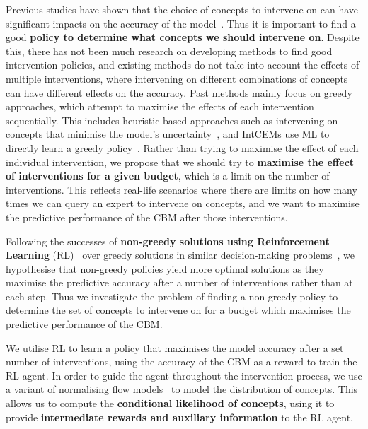 Previous studies have shown that the choice of concepts to 
intervene on can have significant impacts on the accuracy of the model~\cite{coop, cbm, ectp}.
Thus it is important to find a good \textbf{policy to determine what concepts we should intervene on}.
Despite this, there has not been much research on developing
methods to find good intervention policies, and 
existing methods do not
take into account the effects of multiple
interventions, where intervening on different combinations
of concepts can have different effects on the accuracy.
Past methods mainly focus on greedy approaches, which
attempt to maximise the effects of each intervention
sequentially.
This includes heuristic-based approaches such as intervening on concepts that minimise the
model's uncertainty~\cite{ coop, ectp}, and IntCEMs use ML to directly learn a greedy policy~\cite{intcem}.
Rather than trying to maximise the effect of each individual 
intervention, we propose that we should 
try to \textbf{maximise the effect of interventions for a given 
budget}, 
which is a limit on the number of interventions.
This
reflects real-life scenarios where
there are limits on how many times we 
can query an expert to intervene on concepts, and 
we want to maximise the predictive 
performance of the CBM after those interventions.


Following the successes of \textbf{non-greedy solutions 
using 
Reinforcement Learning} (RL)~\cite{rl} over
greedy solutions in similar 
decision-making problems~\cite{gsmrl, non-greedy-2, non-greedy-1},
we hypothesise that non-greedy policies
yield more optimal solutions as they maximise 
the predictive accuracy after a number of interventions rather than at each step.
Thus we investigate the problem of
finding a non-greedy policy to determine
the set of concepts to intervene on for a budget which
maximises the predictive performance of the CBM.

We utilise RL
to learn a policy that maximises
the model accuracy after a set number of interventions,
using the accuracy of the CBM as a reward to train the RL agent.
In order
to guide the agent throughout the intervention process,
we use a variant of normalising flow models~\cite{normalizing-flows} to model the distribution of concepts. 
This allows us to compute the \textbf{conditional likelihood of concepts}, using it to provide \textbf{intermediate rewards and auxiliary information} to the RL agent.

